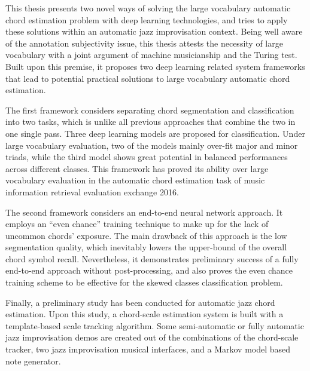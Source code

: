 
This thesis presents two novel ways of solving the large vocabulary automatic chord estimation problem with deep learning technologies, and tries to apply these solutions within an automatic jazz improvisation context. Being well aware of the annotation subjectivity issue, this thesis attests the necessity of large vocabulary with a joint argument of machine musicianship and the Turing test. Built upon this premise, it proposes two deep learning related system frameworks that lead to potential practical solutions to large vocabulary automatic chord estimation.

The first framework considers separating chord segmentation and classification into two tasks, which is unlike all previous approaches that combine the two in one single pass. Three deep learning models are proposed for classification. Under large vocabulary evaluation, two of the models mainly over-fit major and minor triads, while the third model shows great potential in balanced performances across different classes. This framework has proved its ability over large vocabulary evaluation in the automatic chord estimation task of music information retrieval evaluation exchange 2016.

The second framework considers an end-to-end neural network approach. It employs an ``even chance'' training technique to make up for the lack of uncommon chords' exposure. The main drawback of this approach is the low segmentation quality, which inevitably lowers the upper-bound of the overall chord symbol recall. Nevertheless, it demonstrates preliminary success of a fully end-to-end approach without post-processing, and also proves the even chance training scheme to be effective for the skewed classes classification problem.

Finally, a preliminary study has been conducted for automatic jazz chord estimation. Upon this study, a chord-scale estimation system is built with a template-based scale tracking algorithm. Some semi-automatic or fully automatic jazz improvisation demos are created out of the combinations of the chord-scale tracker, two jazz improvisation musical interfaces, and a Markov model based note generator.
